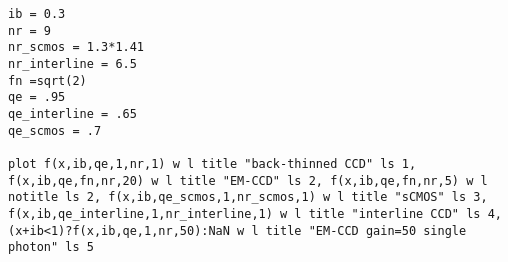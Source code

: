 \begin{verbatim}
ib = 0.3
nr = 9
nr_scmos = 1.3*1.41
nr_interline = 6.5
fn =sqrt(2)
qe = .95
qe_interline = .65
qe_scmos = .7

plot f(x,ib,qe,1,nr,1) w l title "back-thinned CCD" ls 1, f(x,ib,qe,fn,nr,20) w l title "EM-CCD" ls 2, f(x,ib,qe,fn,nr,5) w l notitle ls 2, f(x,ib,qe_scmos,1,nr_scmos,1) w l title "sCMOS" ls 3, f(x,ib,qe_interline,1,nr_interline,1) w l title "interline CCD" ls 4, (x+ib<1)?f(x,ib,qe,1,nr,50):NaN w l title "EM-CCD gain=50 single photon" ls 5
\end{verbatim}




